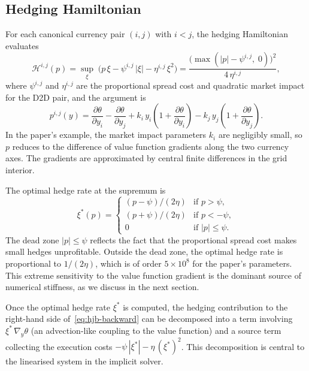 \subsection{Hedging Hamiltonian}
\label{sec:pde-hedging}

For each canonical currency pair $(i,j)$ with $i < j$, the hedging Hamiltonian evaluates
\begin{equation}
  \label{eq:H-hedge}
  \mathcal{H}^{i,j}(p) = \sup_\xi\;\bigl(p\,\xi - \psi^{i,j}\,|\xi| - \eta^{i,j}\,\xi^2\bigr)
  = \frac{\bigl(\max(|p| - \psi^{i,j},\; 0)\bigr)^2}{4\,\eta^{i,j}},
\end{equation}
where $\psi^{i,j}$ and $\eta^{i,j}$ are the proportional spread cost and quadratic market impact for the D2D pair, and the argument is
\begin{equation}
  \label{eq:p-hedge}
  p^{i,j}(y) = \frac{\partial\theta}{\partial y_i} - \frac{\partial\theta}{\partial y_j}
  + k_i\,y_i\!\left(1 + \frac{\partial\theta}{\partial y_i}\right) - k_j\,y_j\!\left(1 + \frac{\partial\theta}{\partial y_j}\right).
\end{equation}
In the paper's example, the market impact parameters $k_i$ are negligibly small, so $p$ reduces to the difference of value function gradients along the two currency axes. The gradients are approximated by central finite differences in the grid interior.

The optimal hedge rate at the supremum is
\begin{equation}
  \label{eq:xi-star}
  \xi^*(p) = \begin{cases}
    (p - \psi) / (2\eta) & \text{if } p > \psi, \\
    (p + \psi) / (2\eta) & \text{if } p < -\psi, \\
    0 & \text{if } |p| \leq \psi.
  \end{cases}
\end{equation}
The dead zone $|p| \leq \psi$ reflects the fact that the proportional spread cost makes small hedges unprofitable. Outside the dead zone, the optimal hedge rate is proportional to $1/(2\eta)$, which is of order $5 \times 10^8$ for the paper's parameters. This extreme sensitivity to the value function gradient is the dominant source of numerical stiffness, as we discuss in the next section.

Once the optimal hedge rate $\xi^*$ is computed, the hedging contribution to the right-hand side of~\eqref{eq:hjb-backward} can be decomposed into a term involving $\xi^*\,\nabla_y\theta$ (an advection-like coupling to the value function) and a source term collecting the execution costs $-\psi\,|\xi^*| - \eta\,(\xi^*)^2$. This decomposition is central to the linearised system in the implicit solver.


